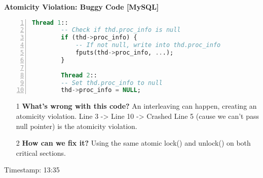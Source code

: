 \documentclass[12pt]{article}
\begin{document}
{\bf Atomicity Violation: Buggy Code [MySQL]}
    \begin{lstlisting}[language=SQL, numbers=left, basicstyle=\ttfamily]
        Thread 1::
        -- Check if thd.proc_info is null
        if (thd->proc_info) {
            -- If not null, write into thd.proc_info
            fputs(thd->proc_info, ...);
        }
        
        Thread 2::
        -- Set thd.proc_info to null
        thd->proc_info = NULL;
    \end{lstlisting}
    \begin{enumerate}
        \item[1]{\bf What's wrong with this code?} {An interleaving can happen, creating an atomicity violation. Line 3 -> Line 10 -> Crashed Line 5 (cause we can't pass null pointer) is the atomicity violation.}
        \item[2]{\bf How can we fix it?} {Using the same atomic lock() and unlock() on both critical sections.}
    \end{enumerate}

Timestamp: 13:35
\end{document}
